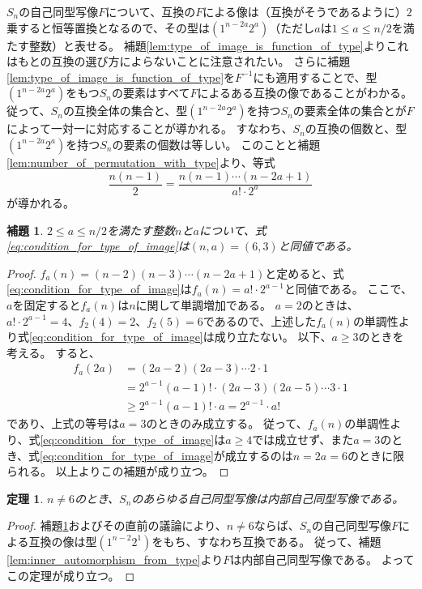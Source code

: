 \documentclass[11pt]{jarticle}
\newtheorem{theorem}{定理}
\newtheorem{lemma}{補題}
\begin{document}
$S_n$の自己同型写像$F$について、互換の$F$による像は（互換がそうであるように）$2$乗すると恒等置換となるので、その型は$(1^{n-2a}2^a)$（ただし$a$は$1 \leq a \leq n/2$を満たす整数）と表せる。
補題\ref{lem:type_of_image_is_function_of_type}よりこれはもとの互換の選び方によらないことに注意されたい。
さらに補題\ref{lem:type_of_image_is_function_of_type}を$F^{-1}$にも適用することで、型$(1^{n-2a}2^a)$をもつ$S_n$の要素はすべて$F$によるある互換の像であることがわかる。
従って、$S_n$の互換全体の集合と、型$(1^{n-2a}2^a)$を持つ$S_n$の要素全体の集合とが$F$によって一対一に対応することが導かれる。
すなわち、$S_n$の互換の個数と、型$(1^{n-2a}2^a)$を持つ$S_n$の要素の個数は等しい。
このことと補題\ref{lem:number_of_permutation_with_type}より、等式
\begin{equation}
\label{eq:condition_for_type_of_image}
\frac{ n(n-1) }{ 2 } = \frac{ n(n-1) \cdots (n-2a+1) }{ a! \cdot 2^a }
\end{equation}
が導かれる。

\begin{lemma}
\label{lem:equation_for_type_of_image}
$2 \leq a \leq n/2$を満たす整数$n$と$a$について、式\eqref{eq:condition_for_type_of_image}は$(n,a) = (6,3)$と同値である。
\end{lemma}
\begin{proof}
$f_a(n) = (n-2)(n-3) \cdots (n-2a+1)$と定めると、式\eqref{eq:condition_for_type_of_image}は$f_a(n) = a! \cdot 2^{a-1}$と同値である。
ここで、$a$を固定すると$f_a(n)$は$n$に関して単調増加である。
$a = 2$のときは、$a! \cdot 2^{a-1} = 4$、$f_2(4) = 2$、$f_2(5) = 6$であるので、上述した$f_a(n)$の単調性より式\eqref{eq:condition_for_type_of_image}は成り立たない。
以下、$a \geq 3$のときを考える。
すると、
\begin{displaymath}
\begin{split}
f_a(2a) &= (2a-2)(2a-3) \cdots 2 \cdot 1 \\
&= 2^{a-1} (a-1)! \cdot (2a-3)(2a-5) \cdots 3 \cdot 1 \\
&\geq 2^{a-1} (a-1)! \cdot a
= 2^{a-1} \cdot a!
\end{split}
\end{displaymath}
であり、上式の等号は$a = 3$のときのみ成立する。
従って、$f_a(n)$の単調性より、式\eqref{eq:condition_for_type_of_image}は$a \geq 4$では成立せず、また$a = 3$のとき、式\eqref{eq:condition_for_type_of_image}が成立するのは$n = 2a = 6$のときに限られる。
以上よりこの補題が成り立つ。
\end{proof}

\begin{theorem}
\label{thm:no_outer_auto_for_n_not_6}
$n \neq 6$のとき、$S_n$のあらゆる自己同型写像は内部自己同型写像である。
\end{theorem}
\begin{proof}
補題\ref{lem:equation_for_type_of_image}およびその直前の議論により、$n \neq 6$ならば、$S_n$の自己同型写像$F$による互換の像は型$(1^{n-2}2^1)$をもち、すなわち互換である。
従って、補題\ref{lem:inner_automorphism_from_type}より$F$は内部自己同型写像である。
よってこの定理が成り立つ。
\end{proof}
\end{document}
